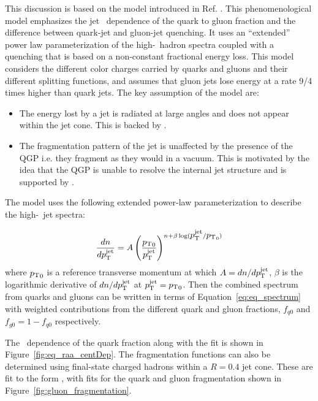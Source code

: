 
This discussion is based on the model introduced in Ref.
\cite{Spousta:2015fca}.
This phenomenological model emphasizes the jet \pt\ dependence of the quark to gluon fraction and the difference between quark-jet and gluon-jet quenching.
It uses an ``extended'' power law parameterization of the high-\pt\ hadron spectra coupled with a quenching that is based on a non-constant fractional energy loss.
This model considers the different color charges carried by quarks and gluons and their different splitting functions, and assumes that gluon jets lose energy at a rate 9/4 times higher than quark jets.
The key assumption of the model are:
\begin{itemize}
\item The energy lost by a jet is radiated at large angles and does not appear within the jet cone.
This is backed by \cite{Chatrchyan:2011sx}.
\item The fragmentation pattern of the jet is unaffected by the presence of the QGP i.e.
they fragment as they would in a vacuum.
This is motivated by the idea that the QGP is unable to resolve the internal jet structure and is supported by \cite{Blaizot:2013hx, CasalderreySolana:2012ef}.
\end{itemize} 

The model uses the following extended power-law parameterization to describe the high-\pt\ jet spectra:

\begin{align}
\frac{dn}{d\mbox{$p_{\mathrm{T}}^{\mathrm{jet}}$}} = A \left( \frac{\mbox{$p_{\mathrm{T}}$}_0}{\mbox{$p_{\mathrm{T}}^{\mathrm{jet}}$}} \right) ^{n+\beta \log(\mbox{$p_{\mathrm{T}}^{\mathrm{jet}}$} / \mbox{$p_{\mathrm{T}}$}_0)}
\label{eq:eq_spectrum}
\end{align}
where $\mbox{$p_{\mathrm{T}}$}_0$ is a reference transverse momentum at which $A= dn/d\mbox{$p_{\mathrm{T}}^{\mathrm{jet}}$}$, $\beta$ is the logarithmic derivative of $dn/d\mbox{$p_{\mathrm{T}}^{\mathrm{jet}}$}$ at $\mbox{$p_{\mathrm{T}}^{\mathrm{jet}}$} = \mbox{$p_{\mathrm{T}}$}_0$.
Then the combined spectrum from quarks and gluons can be written in terms of Equation~\ref{eq:eq_spectrum} with weighted contributions from the different quark and gluon fractions, $f_{q0}$ and $f_{g0} = 1-f_{q0}$ respectively.

The \pt\ dependence of the quark fraction along with the fit is shown in Figure~\ref{fig:eq_raa_centDep}.
The fragmentation functions can also be determined using final-state charged hadrons within a $R=0.4$ jet cone.
These are fit to the form \Dz, with fits for the quark and gluon fragmentation shown in Figure~\ref{fig:gluon_fragmentation}.


